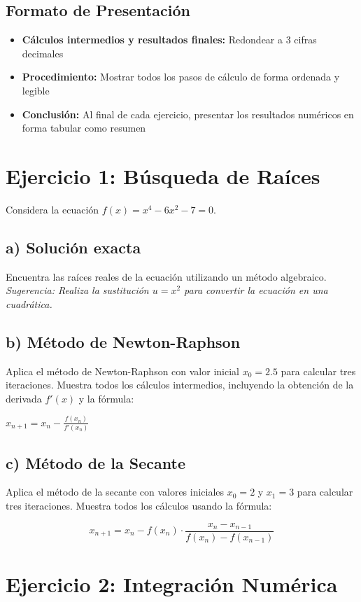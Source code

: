 \documentclass[12pt,a4paper]{article}
\begin{document}
\subsection*{Formato de Presentación}
\begin{itemize}
\item \textbf{Cálculos intermedios y resultados finales:} Redondear a 3 cifras decimales
\item \textbf{Procedimiento:} Mostrar todos los pasos de cálculo de forma ordenada y legible
\item \textbf{Conclusión:} Al final de cada ejercicio, presentar los resultados numéricos en forma tabular como resumen
\end{itemize}

\section*{Ejercicio 1: Búsqueda de Raíces}

Considera la ecuación $f(x) = x^4 - 6x^2 - 7 = 0$.

\subsection*{a) Solución exacta}
Encuentra las raíces reales de la ecuación utilizando un método algebraico. \textit{Sugerencia: Realiza la sustitución $u = x^2$ para convertir la ecuación en una cuadrática.}

\subsection*{b) Método de Newton-Raphson}
Aplica el método de Newton-Raphson con valor inicial $x_0 = 2.5$ para calcular tres iteraciones. Muestra todos los cálculos intermedios, incluyendo la obtención de la derivada $f'(x)$ y la fórmula:

$x_{n+1} = x_n - \frac{f(x_n)}{f'(x_n)}$

\subsection*{c) Método de la Secante}
Aplica el método de la secante con valores iniciales $x_0 = 2$ y $x_1 = 3$ para calcular tres iteraciones. Muestra todos los cálculos usando la fórmula:

$$x_{n+1} = x_n - f(x_n) \cdot \frac{x_n - x_{n-1}}{f(x_n) - f(x_{n-1})}$$

\section*{Ejercicio 2: Integración Numérica}
\end{document}
